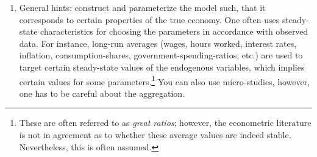 \begin{enumerate}
\item General hints: construct and parameterize the model such, that it corresponds to certain properties of the true economy.
One often uses steady-state characteristics for choosing the parameters in accordance with observed data.
For instance, long-run averages (wages, hours worked, interest rates, inflation, consumption-shares, government-spending-ratios, etc.) are used 
  to target certain steady-state values of the endogenous variables, which implies certain values for some parameters.\footnote{
These are often referred to as \emph{great ratios}; however, the econometric literature is not in agreement as to whether these average values are indeed stable.
Nevertheless, this is often assumed.
  }
You can also use micro-studies, however, one has to be careful about the aggregation.
			

\end{enumerate}
